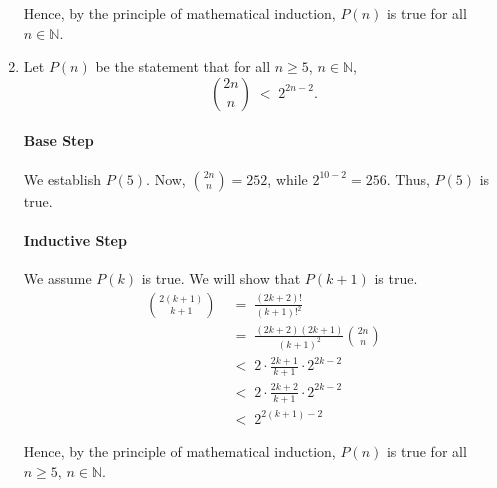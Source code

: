 \documentclass[10pt]{article}
\begin{document}
\begin{enumerate}
                Hence, by the principle of mathematical induction, $P(n)$ is true for all $n \in \mathbb{N}$.

                \item Let $P(n)$ be the statement that for all $n \geq 5$, $n \in \mathbb{N}$,
                \[\binom{2n}{n} \;<\; 2^{2n - 2}.\]
                \paragraph{Base Step}
                We establish $P(5)$. Now, $\binom{2n}{n} = 252$, while $2^{10 - 2} = 256$. Thus, $P(5)$ is true.
                \paragraph{Inductive Step}
                We assume $P(k)$ is true. We will show that $P(k + 1)$ is true.
                \begin{align*}
                \binom{2(k + 1)}{k + 1} \;&=\; \frac{(2k + 2)!}{(k + 1)!^2} \\
                        \;&=\; \frac{(2k + 2)(2k + 1)}{(k + 1)^2} \binom{2n}{n} \\
                        \;&<\; 2\cdot \frac{2k + 1}{k + 1} \cdot 2^{2k - 2} \\
                        \;&<\; 2\cdot \frac{2k + 2}{k + 1} \cdot 2^{2k - 2} \\
                        \;&<\; 2^{2(k + 1) - 2}
                \end{align*}
                
                Hence, by the principle of mathematical induction, $P(n)$ is true for all $n \geq 5$, $n \in \mathbb{N}$.
        \end{enumerate}
        
\end{document}
